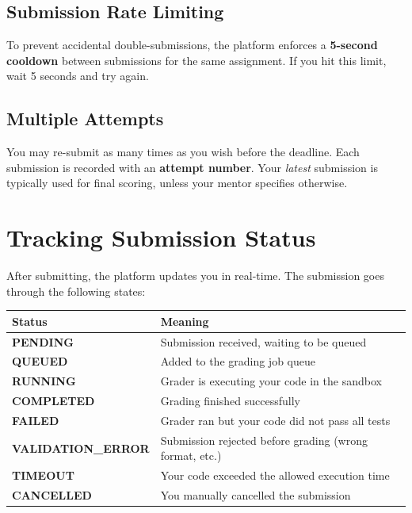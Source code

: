 \documentclass[12pt,a4paper]{article}
\begin{document}
\subsection{Submission Rate Limiting}

To prevent accidental double-submissions, the platform enforces a \textbf{5-second cooldown} between submissions for the same assignment. If you hit this limit, wait 5 seconds and try again.

\subsection{Multiple Attempts}

You may re-submit as many times as you wish before the deadline. Each submission is recorded with an \textbf{attempt number}. Your \emph{latest} submission is typically used for final scoring, unless your mentor specifies otherwise.

\section{Tracking Submission Status}

After submitting, the platform updates you in real-time. The submission goes through the following states:

\begin{center}
\begin{tabularx}{0.9\linewidth}{>{\ttfamily\bfseries}l>{\color{darkgray}}X}
\toprule
Status & Meaning \\
\midrule
PENDING          & Submission received, waiting to be queued \\
QUEUED           & Added to the grading job queue \\
RUNNING          & Grader is executing your code in the sandbox \\
COMPLETED        & Grading finished successfully \\
FAILED           & Grader ran but your code did not pass all tests \\
VALIDATION\_ERROR & Submission rejected before grading (wrong format, etc.) \\
TIMEOUT          & Your code exceeded the allowed execution time \\
CANCELLED        & You manually cancelled the submission \\
\bottomrule
\end{tabularx}
\end{center}
\end{document}
